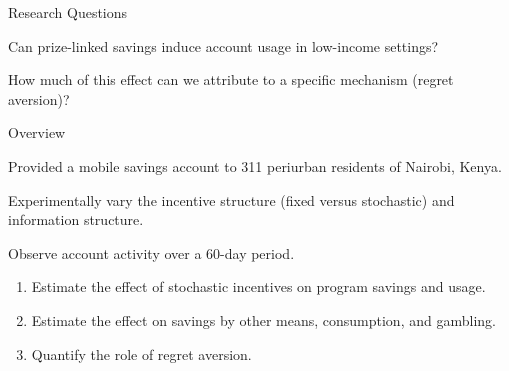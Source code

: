 \documentclass[aspectratio=169]{beamer}
\newenvironment{wideitemize}{\itemize\addtolength{\itemsep}{10pt}}{\enditemize}
\newenvironment{wideenumerate}{\enumerate\addtolength{\itemsep}{10pt}}{\endenumerate}
\begin{document}
\begin{frame}{Research Questions}

	\begin{wideenumerate}

		\item Can prize-linked savings induce account usage in low-income settings?
		\item How much of this effect can we attribute to a specific mechanism (regret aversion)?


	\end{wideenumerate}

\end{frame}

\begin{frame}{Overview}

	\begin{wideitemize}

		\item Provided a mobile savings account to 311 periurban residents of Nairobi, Kenya.
		\item Experimentally vary the incentive structure (fixed versus stochastic) and information structure.
		\item Observe account activity over a 60-day period.

		\begin{enumerate}
			\item Estimate the effect of stochastic incentives on program savings and usage.
			\item Estimate the effect on savings by other means, consumption, and gambling.
			\item Quantify the role of regret aversion.
		\end{enumerate}

	\end{wideitemize}

\end{frame}

	

\end{document}
